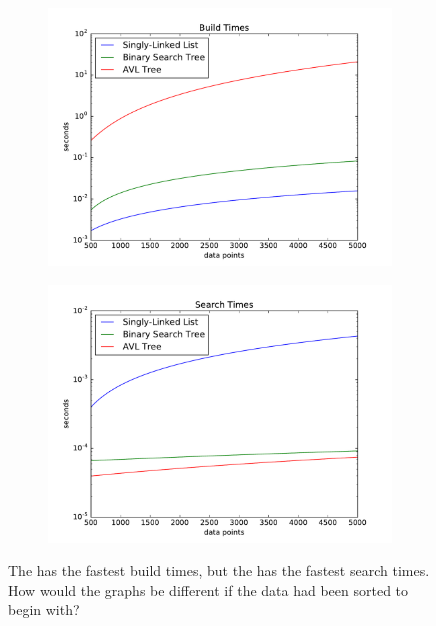 \begin{problem}
\begin{figure}[H] %
    \centering
    \begin{subfigure}[b]{.5\textwidth}
        \centering
        \includegraphics[width=\textwidth]{BuildTimes.pdf}
    \end{subfigure}%
    \begin{subfigure}[b]{.5\textwidth}
        \centering
        \includegraphics[width=\textwidth]{SearchTimes.pdf}
    \end{subfigure}
    \caption{The  has the fastest build times, but the  has the fastest search times. How would the graphs be different if the data had been sorted to begin with?}
    \label{fig:times}
\end{figure}
\end{problem}


